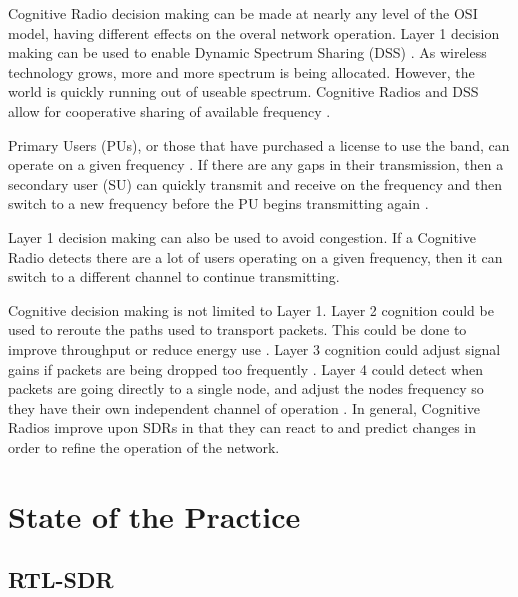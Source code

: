 Cognitive Radio decision making can be made at nearly any level of the OSI model, having different effects on the overal network operation. Layer 1 decision making can be used to enable Dynamic Spectrum Sharing (DSS) \cite{5771952}. As wireless technology grows, more and more spectrum is being allocated. However, the world is quickly running out of useable spectrum. Cognitive Radios and DSS allow for cooperative sharing of available frequency \cite{5771952}. 

Primary Users (PUs), or those that have purchased a license to use the band, can operate on a given frequency \cite{4562561}. If there are any gaps in their transmission, then a secondary user (SU) can quickly transmit and receive on the frequency and then switch to a new frequency before the PU begins transmitting again \cite{4562561}. 

Layer 1 decision making can also be used to avoid congestion. If a Cognitive Radio detects there are a lot of users operating on a given frequency, then it can switch to a different channel to continue transmitting.\cite{Akyildiz2007921} 

Cognitive decision making is not limited to Layer 1. Layer 2 cognition could be used to reroute the paths used to transport packets. This could be done to improve throughput or reduce energy use \cite{6527405}. Layer 3 cognition could adjust signal gains if packets are being dropped too frequently \cite{6072038}. Layer 4 could detect when packets are going directly to a single node, and adjust the nodes frequency so they have their own independent channel of operation \cite{5062176}. In general, Cognitive Radios improve upon SDRs in that they can react to and predict changes in order to refine the operation of the network. 


  

\section{State of the Practice}

\subsection{RTL-SDR}

